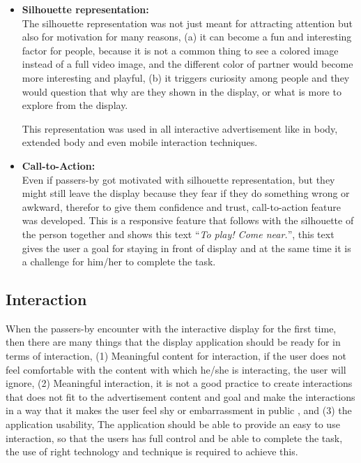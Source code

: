 \begin{itemize}

\item \textbf{Silhouette representation:}\\
The silhouette representation was not just meant for attracting attention but also for motivation for many reasons, (a) it can become a fun and interesting factor for people, because it is not a common thing to see a colored image instead of a full video image, and the different color of partner would become more interesting and playful, (b) it triggers curiosity among people and they would question that why are they shown in the display, or what is more to explore from the display. 

This representation was used in all interactive advertisement like in body, extended body and even mobile interaction techniques.

\item \textbf{Call-to-Action:} \\
Even if passers-by got motivated with silhouette representation, but they might still leave the display because they fear if they do something wrong or awkward, therefor to give them confidence and trust, call-to-action feature was developed. This is a responsive feature that follows with the silhouette of the person together and shows this text ``\emph{To play! Come near.}'', this text gives the user a goal for staying in front of display and at the same time it is a challenge for him/her to complete the task.

\end{itemize}


\subsection{Interaction}
When the passers-by encounter with the interactive display for the first time, then there are many things that the display application should be ready for in terms of interaction, (1) Meaningful content for interaction\cite{ Meaningful_ad}, if the user does not feel comfortable with the content with which he/she is interacting, the user will ignore, (2) Meaningful interaction, it is not a good practice to create interactions that does not fit to the advertisement content and goal and make the interactions in a way that it makes the user feel shy or embarrassment in public \cite{EnticingPeople}, and (3) the application usability,  The application should be able to provide an easy to use interaction, so that the users has full control and be able to complete the task, the use of right technology and technique is required to achieve this.

